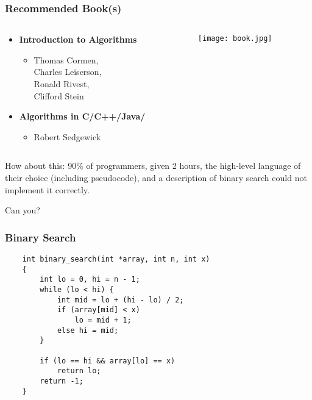 \documentclass{beamer}
\begin{document}
\begin{frame}
    \frametitle{Recommended Book(s)}
    \begin{columns}[t]
        \begin{column}[T]{5cm}
            \begin{itemize}
                \item \textbf{Introduction to Algorithms}
                    \begin{itemize}
                        \item Thomas Cormen,\\ Charles Leiserson,\\ Ronald Rivest,\\ Clifford Stein
                    \end{itemize}
                \item \textbf{Algorithms in C/C++/Java/}
                    \begin{itemize}
                        \item Robert Sedgewick
                    \end{itemize}
            \end{itemize}
        \end{column}
        \begin{column}[T]{5cm}
            \texttt{[image: book.jpg]}
        \end{column}
    \end{columns}
\end{frame}


\begin{frame}
    How about this: 90\% of programmers, given 2 hours, the high-level language of their choice (including pseudocode), and a description of binary search could not implement it correctly.

    \vspace{15mm}
    \pause
    Can you?
\end{frame}

\begin{frame}[fragile]
    \frametitle{Binary Search}
    \lstset{language=C}
    \begin{lstlisting}
    int binary_search(int *array, int n, int x)
    {
        int lo = 0, hi = n - 1;
        while (lo < hi) {
            int mid = lo + (hi - lo) / 2;
            if (array[mid] < x)
                lo = mid + 1;
            else hi = mid;
        }

        if (lo == hi && array[lo] == x)
            return lo;
        return -1;
    }
    \end{lstlisting}
\end{frame}
\end{document}
